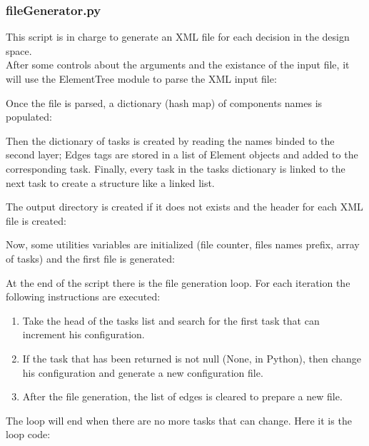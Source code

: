 \documentclass[../main.tex]{subfiles}
\begin{document}
    \subsubsection{fileGenerator.py}
      This script is in charge to generate an XML file for each decision in the design space.\\
      After some controls about the arguments and the existance of the input file, it will use the ElementTree\cite{elemtree} module to parse the XML input file:
      
      Once the file is parsed, a dictionary\cite{dictionary} (hash map) of components names is populated:
      
      Then the dictionary\cite{dictionary} of tasks is created by reading the names binded to the second layer; Edges tags are stored in a list of Element\cite{elemtree} objects and added to the corresponding task. Finally, every task in the tasks dictionary\cite{dictionary} is linked to the next task to create a structure like a linked list.
      
      The output directory is created if it does not exists and the header for each XML file is created:
      
      Now, some utilities variables are initialized (file counter, files names prefix, array of tasks) and the first file is generated:
      
      At the end of the script there is the file generation loop. For each iteration the following instructions are executed:
      \begin{enumerate}
        \item Take the head of the tasks list and search for the first task that can increment his configuration.
        \item If the task that has been returned is not null (None, in Python), then change his configuration and generate a new configuration file.
        \item After the file generation, the list of edges is cleared to prepare a new file.
      \end{enumerate}
      The loop will end when there are no more tasks that can change.
      Here it is the loop code:
\end{document}
